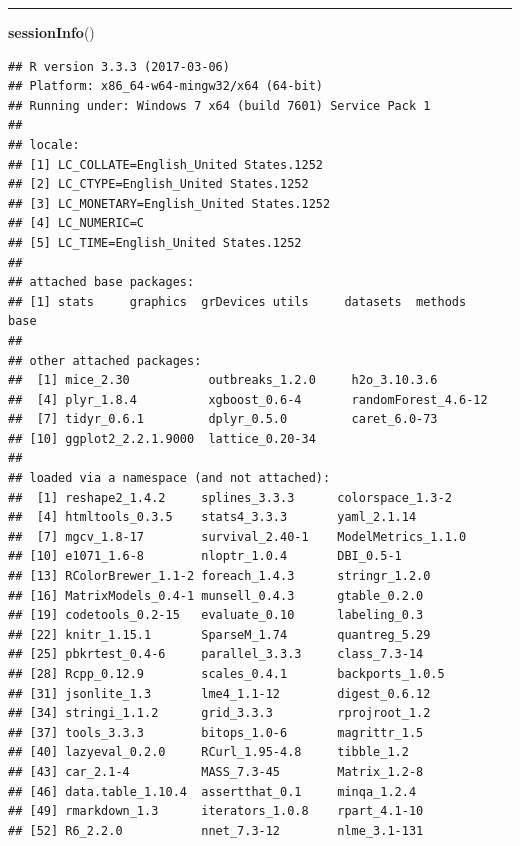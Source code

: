 \documentclass[]{article}
\newenvironment{Shaded}{\begin{snugshade}}{\end{snugshade}}
\newcommand{\KeywordTok}[1]{\textcolor[rgb]{0.13,0.29,0.53}{\textbf{{#1}}}}
\newcommand{\NormalTok}[1]{{#1}}
\begin{document}
\begin{center}\rule{0.5\linewidth}{\linethickness}\end{center}

\begin{Shaded}
\begin{Highlighting}[]
\KeywordTok{sessionInfo}\NormalTok{()}
\end{Highlighting}
\end{Shaded}

\begin{verbatim}
## R version 3.3.3 (2017-03-06)
## Platform: x86_64-w64-mingw32/x64 (64-bit)
## Running under: Windows 7 x64 (build 7601) Service Pack 1
## 
## locale:
## [1] LC_COLLATE=English_United States.1252 
## [2] LC_CTYPE=English_United States.1252   
## [3] LC_MONETARY=English_United States.1252
## [4] LC_NUMERIC=C                          
## [5] LC_TIME=English_United States.1252    
## 
## attached base packages:
## [1] stats     graphics  grDevices utils     datasets  methods   base     
## 
## other attached packages:
##  [1] mice_2.30           outbreaks_1.2.0     h2o_3.10.3.6       
##  [4] plyr_1.8.4          xgboost_0.6-4       randomForest_4.6-12
##  [7] tidyr_0.6.1         dplyr_0.5.0         caret_6.0-73       
## [10] ggplot2_2.2.1.9000  lattice_0.20-34    
## 
## loaded via a namespace (and not attached):
##  [1] reshape2_1.4.2     splines_3.3.3      colorspace_1.3-2  
##  [4] htmltools_0.3.5    stats4_3.3.3       yaml_2.1.14       
##  [7] mgcv_1.8-17        survival_2.40-1    ModelMetrics_1.1.0
## [10] e1071_1.6-8        nloptr_1.0.4       DBI_0.5-1         
## [13] RColorBrewer_1.1-2 foreach_1.4.3      stringr_1.2.0     
## [16] MatrixModels_0.4-1 munsell_0.4.3      gtable_0.2.0      
## [19] codetools_0.2-15   evaluate_0.10      labeling_0.3      
## [22] knitr_1.15.1       SparseM_1.74       quantreg_5.29     
## [25] pbkrtest_0.4-6     parallel_3.3.3     class_7.3-14      
## [28] Rcpp_0.12.9        scales_0.4.1       backports_1.0.5   
## [31] jsonlite_1.3       lme4_1.1-12        digest_0.6.12     
## [34] stringi_1.1.2      grid_3.3.3         rprojroot_1.2     
## [37] tools_3.3.3        bitops_1.0-6       magrittr_1.5      
## [40] lazyeval_0.2.0     RCurl_1.95-4.8     tibble_1.2        
## [43] car_2.1-4          MASS_7.3-45        Matrix_1.2-8      
## [46] data.table_1.10.4  assertthat_0.1     minqa_1.2.4       
## [49] rmarkdown_1.3      iterators_1.0.8    rpart_4.1-10      
## [52] R6_2.2.0           nnet_7.3-12        nlme_3.1-131
\end{verbatim}
\end{document}
